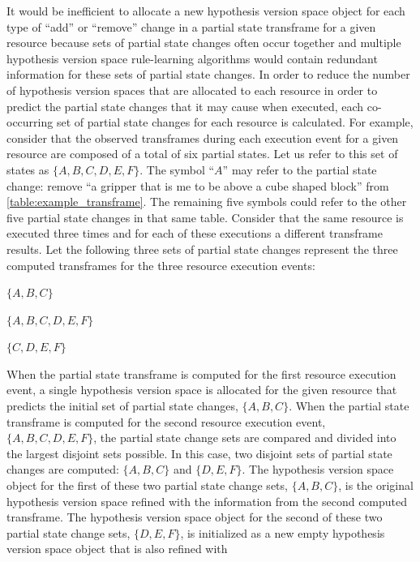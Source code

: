 It would be inefficient to allocate a new hypothesis version space
object for each type of ``add'' or ``remove'' change in a partial
state transframe for a given resource because sets of partial state
changes often occur together and multiple hypothesis version space
rule-learning algorithms would contain redundant information for these
sets of partial state changes.  In order to reduce the number of
hypothesis version spaces that are allocated to each resource in order
to predict the partial state changes that it may cause when executed,
each co-occurring set of partial state changes for each resource is
calculated.  For example, consider that the observed transframes
during each execution event for a given resource are composed of a
total of six partial states.  Let us refer to this set of states as
$\{A, B, C, D, E, F\}$.  The symbol ``$A$'' may refer to the partial
state change: remove ``a gripper that is me to be above a cube shaped
block'' from {\mbox{\autoref{table:example_transframe}}}.  The
remaining five symbols could refer to the other five partial state
changes in that same table.  Consider that the same resource is
executed three times and for each of these executions a different
transframe results.  Let the following three sets of partial state
changes represent the three computed transframes for the three
resource execution events:
\begin{packed_enumerate}
\item{$\{A, B, C\}$}
\item{$\{A, B, C, D, E, F\}$}
\item{$\{C, D, E, F\}$}
\end{packed_enumerate}
When the partial state transframe is computed for the first resource
execution event, a single hypothesis version space is allocated for
the given resource that predicts the initial set of partial state
changes, $\{A, B, C\}$.  When the partial state transframe is computed
for the second resource execution event, $\{A, B, C, D, E, F\}$, the
partial state change sets are compared and divided into the largest
disjoint sets possible.  In this case, two disjoint sets of partial
state changes are computed: $\{A, B, C\}$ and $\{D, E, F\}$.  The
hypothesis version space object for the first of these two partial
state change sets, $\{A, B, C\}$, is the original hypothesis version
space refined with the information from the second computed
transframe.  The hypothesis version space object for the second of
these two partial state change sets, $\{D, E, F\}$, is initialized as
a new empty hypothesis version space object that is also refined with
